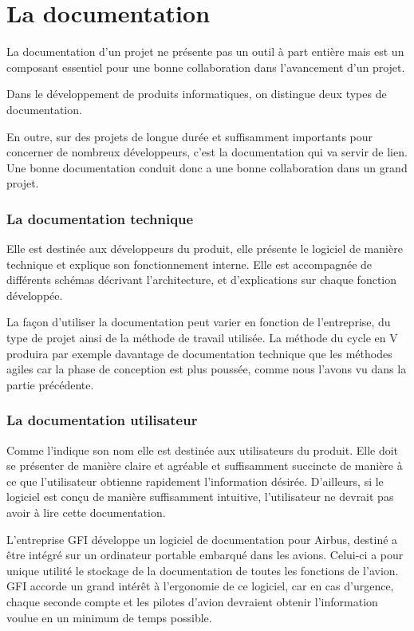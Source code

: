 \section{La documentation}

La documentation d'un projet ne présente pas un outil à part entière mais est un composant essentiel pour une bonne collaboration dans l'avancement d'un projet.

Dans le développement de produits informatiques, on distingue deux types de documentation.

En outre, sur des projets de longue durée et suffisamment importants pour concerner de nombreux développeurs, c'est la documentation qui va servir de lien. Une bonne documentation conduit donc a une bonne collaboration dans un grand projet.

\subsubsection{La documentation technique}

Elle est destinée aux développeurs du produit, elle présente le logiciel de manière technique et explique son fonctionnement interne. Elle est accompagnée de différents schémas décrivant l'architecture, et d'explications sur chaque fonction développée.

La façon d'utiliser la documentation peut varier en fonction de l'entreprise, du type de projet ainsi de la méthode de travail utilisée. La méthode du cycle en V produira par exemple davantage de documentation technique que les méthodes agiles car la phase de conception est plus poussée, comme nous l'avons vu dans la partie précédente.

\subsubsection{La documentation utilisateur}

Comme l'indique son nom elle est destinée aux utilisateurs du produit. Elle doit se présenter de manière claire et agréable et suffisamment succincte de manière à ce que l'utilisateur obtienne rapidement l'information désirée.
D'ailleurs, si le logiciel est conçu de manière suffisamment intuitive, l'utilisateur ne devrait pas avoir à lire cette documentation.

\begin{app}
L'entreprise GFI développe un logiciel de documentation pour Airbus, destiné a être intégré sur un ordinateur portable embarqué dans les avions. Celui-ci a pour unique utilité le stockage de la documentation de toutes les fonctions de l'avion. GFI accorde un grand intérêt à l'ergonomie de ce logiciel, car en cas d'urgence, chaque seconde compte et les pilotes d'avion devraient obtenir l'information voulue en un minimum de temps possible.
\end{app}

